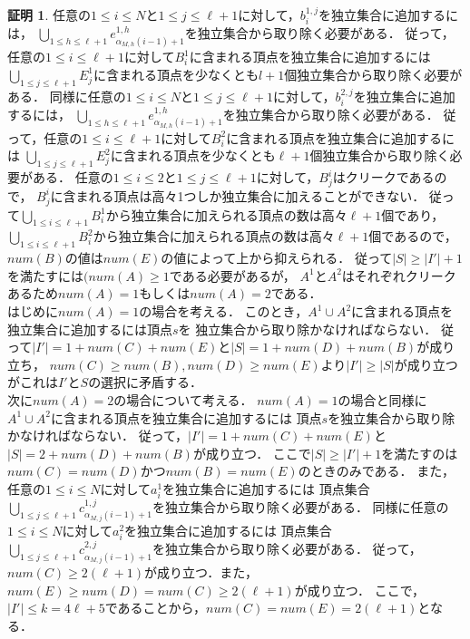 \documentclass[12pt]{thesis}
\theoremstyle{definition}
\newtheorem*{prf*}{証明}
\begin{document}
\begin{prf*}
任意の$1\leq i \leq N$と$1\leq j \leq \ell+1$に対して，$b^{1,j}_{i}$を独立集合に追加するには，
$\bigcup_{1\leq h \leq \ell+1} e^{1,h}_{\alpha_{M,h}(i-1)+1}$を独立集合から取り除く必要がある．
従って，任意の$1\leq i \leq \ell+1$に対して$B^{1}_{i}$に含まれる頂点を独立集合に追加するには
$\bigcup_{1\leq j \leq \ell+1}E^{1}_{j}$に含まれる頂点を少なくとも$l+1$個独立集合から取り除く必要がある．
同様に任意の$1\leq i \leq N$と$1\leq j \leq \ell+1$に対して，$b^{2,j}_{i}$を独立集合に追加するには，
$\bigcup_{1\leq h \leq \ell+1} e^{1,h}_{\alpha_{M,h}(i-1)+1}$を独立集合から取り除く必要がある．
従って，任意の$1\leq i \leq \ell+1$に対して$B^{2}_{i}$に含まれる頂点を独立集合に追加するには
$\bigcup_{1\leq j \leq \ell+1}E^{2}_{j}$に含まれる頂点を少なくとも$\ell+1$個独立集合から取り除く必要がある．
任意の$1\leq i \leq 2$と$1\leq j \leq \ell+1$に対して，$B^{i}_{j}$はクリークであるので，
$B^{i}_{j}$に含まれる頂点は高々1つしか独立集合に加えることができない．
従って$\bigcup_{1\leq i \leq \ell+1}B^{1}_{i}$から独立集合に加えられる頂点の数は高々$\ell+1$個であり，
$\bigcup_{1\leq i \leq \ell+1}B^{2}_{i}$から独立集合に加えられる頂点の数は高々$\ell+1$個であるので，
$num(B)$の値は$num(E)$の値によって上から抑えられる．
従って$|S|\geq |I'|+1$を満たすには$(num(A) \geq 1$である必要があるが，
$A^{1}$と$A^{2}$はそれぞれクリークあるため$num(A) = 1$もしくは$num(A) = 2$である．\\
はじめに$num(A)=1$の場合を考える．
このとき，$A^{1} \cup A^{2}$に含まれる頂点を独立集合に追加するには頂点$s$を
独立集合から取り除かなければならない．
従って$|I'|=1+num(C)+num(E)$と$|S|=1+num(D)+num(B)$が成り立ち，
$num(C)\geq num(B), num(D)\geq num(E)$より$|I'|\geq |S|$が成り立つがこれは$I'$と$S$の選択に矛盾する．\\
次に$num(A)=2$の場合について考える．
$num(A)=1$の場合と同様に$A^{1} \cup A^{2}$に含まれる頂点を独立集合に追加するには
頂点$s$を独立集合から取り除かなければならない．
従って，$|I'|=1+num(C)+num(E)$と$|S|=2+num(D)+num(B)$が成り立つ．
ここで$|S| \geq |I'|+1$を満たすのは$num(C)=num(D)$かつ$num(B)=num(E)$のときのみである．
また，任意の$1\leq i \leq N$に対して$a^{1}_{i}$を独立集合に追加するには
頂点集合$\bigcup_{1\leq j \leq \ell+1} c^{1,j}_{\alpha_{M,j}(i-1)+1}$を独立集合から取り除く必要がある．
同様に任意の$1\leq i \leq N$に対して$a^{2}_{i}$を独立集合に追加するには
頂点集合$\bigcup_{1\leq j \leq \ell+1} c^{2,j}_{\alpha_{M,j}(i-1)+1}$を独立集合から取り除く必要がある．
従って，$num(C) \geq 2 (\ell+1)$が成り立つ．また，$num(E)\geq num(D)=num(C) \geq 2(\ell+1)$が成り立つ．
ここで，$|I'|\leq k=4\ell+5$であることから，$num(C)=num(E)=2(\ell+1)$となる． \\

\end{prf*}
\end{document}
